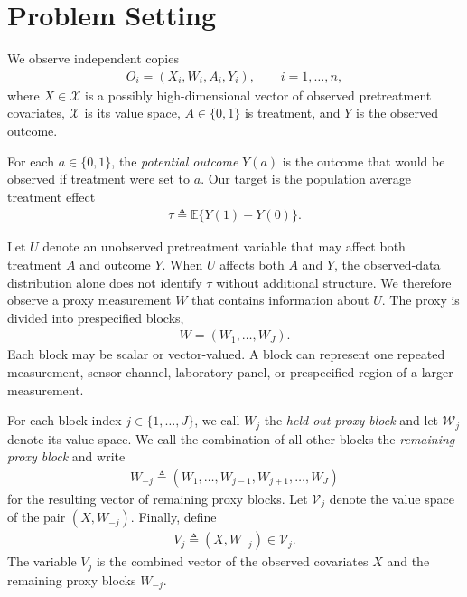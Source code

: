 \section{Problem Setting}
\label{sec:setup}

We observe independent copies
\begin{align}
O_i=(X_i,W_i,A_i,Y_i),
\qquad i=1,\ldots,n,
\end{align}
where $X\in\mathcal X$ is a possibly high-dimensional vector of observed pretreatment covariates, $\mathcal X$ is its value space, $A\in\{0,1\}$ is treatment, and $Y$ is the observed outcome.

For each $a\in\{0,1\}$, the \emph{potential outcome} $Y(a)$ is the outcome that would be observed if treatment were set to $a$. Our target is the population average treatment effect
\begin{align}
\tau\triangleq\mathbb E\{Y(1)-Y(0)\}.
\end{align}

Let $U$ denote an unobserved pretreatment variable that may affect both treatment $A$ and outcome $Y$. When $U$ affects both $A$ and $Y$, the observed-data distribution alone does not identify $\tau$ without additional structure. We therefore observe a proxy measurement $W$ that contains information about $U$. The proxy is divided into prespecified blocks,
\begin{align}
W=(W_1,\ldots,W_J).
\end{align}
Each block may be scalar or vector-valued. A block can represent one repeated measurement, sensor channel, laboratory panel, or prespecified region of a larger measurement.

For each block index $j\in\{1,\ldots,J\}$, we call $W_j$ the \emph{held-out proxy block} and let $\mathcal W_j$ denote its value space. We call the combination of all other blocks the \emph{remaining proxy block} and write
\begin{align}
W_{-j}
\triangleq
(W_1,\ldots,W_{j-1},W_{j+1},\ldots,W_J)
\end{align}
for the resulting vector of remaining proxy blocks. Let $\mathcal V_j$ denote the value space of the pair $(X,W_{-j})$. Finally, define
\begin{align}
V_j\triangleq(X,W_{-j})\in\mathcal V_j.
\label{eq:representation-input}
\end{align}
The variable $V_j$ is the combined vector of the observed covariates $X$ and the remaining proxy blocks $W_{-j}$.
